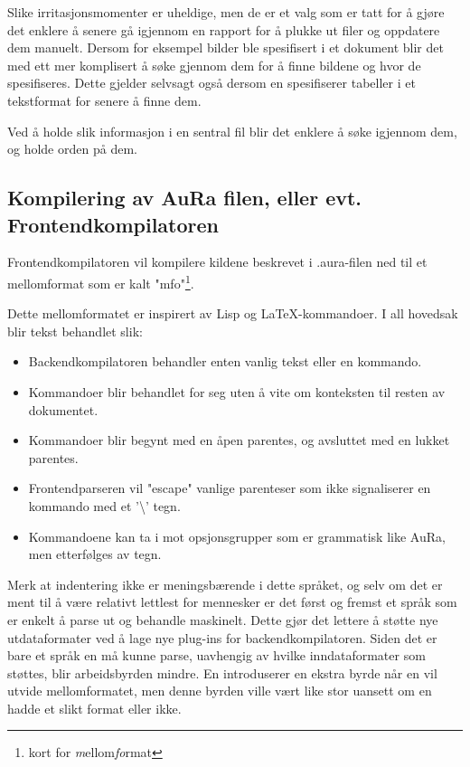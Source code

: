 \documentclass[11pt]{article}
\begin{document}
Slike irritasjonsmomenter er uheldige, men de er et valg som er tatt for å gjøre det enklere å senere gå igjennom en rapport for å plukke ut filer og oppdatere dem manuelt. Dersom for eksempel bilder ble spesifisert i et dokument blir det med ett mer komplisert å søke gjennom dem for å finne bildene og hvor de spesifiseres. Dette gjelder selvsagt også dersom en spesifiserer tabeller i et tekstformat for senere å finne dem.



Ved å holde slik informasjon i en sentral fil blir det enklere å søke igjennom dem, og holde orden på dem.



\subsection{Kompilering av AuRa filen, eller evt. Frontendkompilatoren}



Frontendkompilatoren vil kompilere kildene beskrevet i .aura-filen ned til et mellomformat som er kalt "mfo"\footnote{kort for \emph{m}ellom\emph{fo}rmat}.



Dette mellomformatet er inspirert av Lisp og LaTeX-kommandoer. I all hovedsak blir tekst behandlet slik:




\begin{itemize}
\item Backendkompilatoren behandler enten vanlig tekst eller en kommando.
\item Kommandoer blir behandlet for seg uten å vite om konteksten til resten av dokumentet.
\item Kommandoer blir begynt med en åpen parentes, og avsluttet med en lukket parentes.
\item Frontendparseren vil "escape" vanlige parenteser som ikke signaliserer en kommando med et '\textbackslash ' tegn.
\item Kommandoene kan ta i mot opsjonsgrupper som er grammatisk like AuRa, men etterfølges av tegn.
\end{itemize}




Merk at indentering ikke er meningsbærende i dette språket, og selv om det er ment til å være relativt lettlest for mennesker er det først og fremst et språk som er enkelt å parse ut og behandle maskinelt. Dette gjør det lettere å støtte nye utdataformater ved å lage nye plug-ins for backendkompilatoren. Siden det er bare et språk en må kunne parse, uavhengig av hvilke inndataformater som støttes, blir arbeidsbyrden mindre. En introduserer en ekstra byrde når en vil utvide mellomformatet, men denne byrden ville vært like stor uansett om en hadde et slikt format eller ikke.
\end{document}
